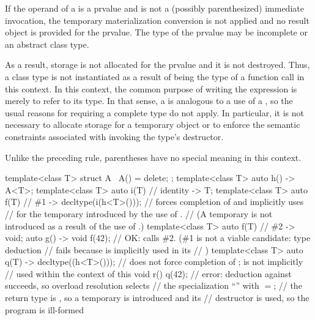 \pnum
If the operand of a  is a prvalue
and is not a (possibly parenthesized) immediate invocation,
the temporary materialization conversion is not applied
and no result object is provided for the prvalue.
The type of the prvalue may be incomplete or an abstract class type.
\begin{note}
As a result, storage is not allocated for the prvalue and it is not destroyed.
Thus, a class type is not instantiated
as a result of being the type of a function call in this context.
In this context, the common purpose of
writing the expression is merely to refer to its type. In that sense, a
 is analogous to a use of a ,
so the usual reasons for requiring a complete type do not apply. In particular,
it is not necessary to allocate storage for a temporary object or to enforce the
semantic constraints associated with invoking the type's destructor.
\end{note}
\begin{note}
Unlike the preceding rule, parentheses have no special meaning in this context.
\end{note}
\begin{example}
\begin{codeblock}
template<class T> struct A { ~A() = delete; };
template<class T> auto h()
  -> A<T>;
template<class T> auto i(T)     // identity
  -> T;
template<class T> auto f(T)     // \#1
  -> decltype(i(h<T>()));       // forces completion of  and implicitly uses 
                                // for the temporary introduced by the use of .
                                // (A temporary is not introduced as a result of the use of .)
template<class T> auto f(T)     // \#2
  -> void;
auto g() -> void {
  f(42);                        // OK: calls \#2. (\#1 is not a viable candidate: type deduction
                                // fails because  is implicitly used in its
                                // )
}
template<class T> auto q(T)
  -> decltype((h<T>()));        // does not force completion of ;  is not implicitly
                                // used within the context of this 
void r() {
  q(42);                        // error: deduction against  succeeds, so overload resolution selects
                                // the specialization ``'' with $=$;
                                // the return type is , so a temporary is introduced and its
                                // destructor is used, so the program is ill-formed
}
\end{codeblock}
\end{example}

